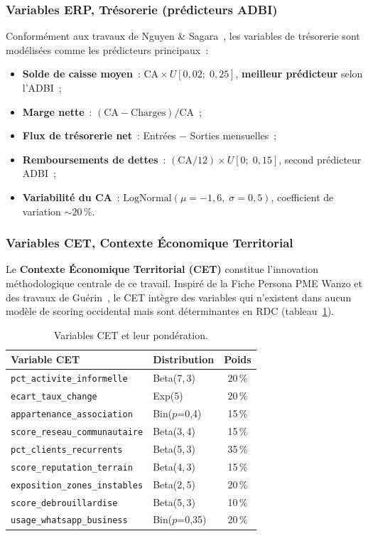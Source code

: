 \documentclass[12pt, a4paper, twocolumn]{article}
\begin{document}
\subsubsection{Variables ERP, Trésorerie (prédicteurs ADBI)}
\label{subsubsec:erp_tresorerie}

Conformément aux travaux de Nguyen \& Sagara~\cite{nguyen2020}, les variables de trésorerie sont modélisées comme les prédicteurs principaux~:
\begin{itemize}[leftmargin=*]
  \item \textbf{Solde de caisse moyen}~: $\text{CA} \times U[0{,}02;\;0{,}25]$, \textbf{meilleur prédicteur} selon l'ADBI~;
  \item \textbf{Marge nette}~: $(\text{CA} - \text{Charges}) / \text{CA}$~;
  \item \textbf{Flux de trésorerie net}~: Entrées $-$ Sorties mensuelles~;
  \item \textbf{Remboursements de dettes}~: $(\text{CA}/12) \times U[0;\;0{,}15]$, second prédicteur ADBI~;
  \item \textbf{Variabilité du CA}~: $\text{LogNormal}(\mu=-1{,}6,\;\sigma=0{,}5)$, coefficient de variation ${\sim}20\,\%$.
\end{itemize}

\subsubsection{Variables CET, Contexte Économique Territorial}
\label{subsubsec:cet}

Le \textbf{Contexte Économique Territorial (CET)} constitue l'innovation méthodologique centrale de ce travail. Inspiré de la Fiche Persona PME Wanzo \cite{persona2024} et des travaux de Guérin~\cite{guerin2015}, le CET intègre des variables qui n'existent dans aucun modèle de scoring occidental mais sont déterminantes en RDC (tableau~\ref{tab:cet}).

\begin{table}[htbp]
\centering
\caption{Variables CET et leur pondération.}
\label{tab:cet}
\small
\begin{tabularx}{\columnwidth}{@{}Xlc@{}}
\toprule
\textbf{Variable CET} & \textbf{Distribution} & \textbf{Poids} \\
\midrule
\texttt{pct\_activite\_informelle} & Beta(7,\,3) & 20\,\% \\
\texttt{ecart\_taux\_change} & Exp(5) & 20\,\% \\
\texttt{appartenance\_association} & Bin($p$=0,4) & 15\,\% \\
\texttt{score\_reseau\_communautaire} & Beta(3,\,4) & 15\,\% \\
\texttt{pct\_clients\_recurrents} & Beta(5,\,3) & 35\,\% \\
\texttt{score\_reputation\_terrain} & Beta(4,\,3) & 15\,\% \\
\texttt{exposition\_zones\_instables} & Beta(2,\,5) & 20\,\% \\
\texttt{score\_debrouillardise} & Beta(5,\,3) & 10\,\% \\
\texttt{usage\_whatsapp\_business} & Bin($p$=0,35) & 20\,\% \\
\bottomrule
\end{tabularx}
\end{table}
\end{document}
